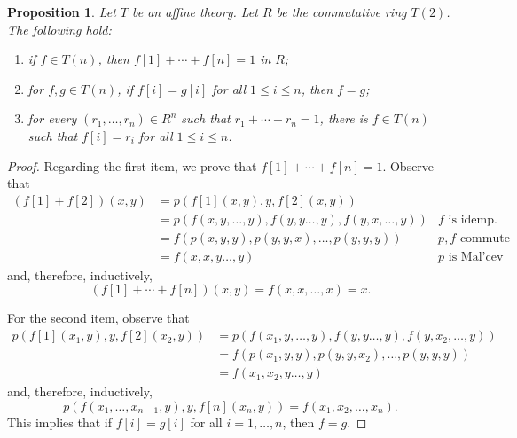 \documentclass{amsart}
\numberwithin{equation}{section}
\theoremstyle{plain}
\newtheorem{proposition}[theorem]{Proposition}
\theoremstyle{definition}
\begin{document}
\begin{proposition}
  \label{prop:coord}
  Let $T$ be an affine theory.
  Let $R$ be the commutative ring $T(2)$. 
  The following hold: 
  \begin{enumerate}
    \item if $f \in T(n)$, then $f[1]+\cdots+f[n]=1$ in $R$; 
    \item for $f,g \in T(n)$, if $f[i]=g[i]$ for all $1 \le i \le n$, then $f=g$; 
    \item for every $(r_1, \ldots, r_n) \in R^n$ such that $r_1+\cdots+r_n=1$, there is $f \in T(n)$ such that $f[i]=r_i$ for all $1 \le i \le n$. 
  \end{enumerate}
\end{proposition}
\begin{proof}
    Regarding the first item, we prove that $f[1] + \cdots + f[n] = 1$. 
    Observe that 
    \begin{align*}
      (f[1]+f[2])(x,y) & = p(f[1](x,y),y,f[2](x,y)) & \\
      & = p(f(x,y, \ldots, y) , f(y,y \ldots, y), f(y,x, \ldots, y)) & f \text{ is idemp.}\\
      & = f(p(x,y,y), p(y,y,x), \ldots, p(y,y,y)) & p,f \text{ commute} \\
      & = f(x,x,y \ldots, y) & p \text{ is Mal'cev} 
    \end{align*}
    and, therefore, inductively, 
    \begin{equation*}
      (f[1]+ \cdots + f[n])(x,y) = f(x,x, \ldots,x) =x \text{.}
    \end{equation*}

    For the second item, observe that 
    \begin{align*}
      p(f[1](x_1,y),y,f[2](x_2,y)) & = p(f(x_1,y, \ldots, y) , f(y,y \ldots, y), f(y,x_2, \ldots, y)) & \\
      & = f(p(x_1,y,y), p(y,y,x_2), \ldots, p(y,y,y)) &  \\
      & = f(x_1,x_2,y \ldots, y) &
    \end{align*}
    and, therefore, inductively, 
    \begin{equation*}
      p(f(x_1,\ldots,x_{n-1},y), y,f[n](x_n,y)) = f(x_1,x_2, \ldots,x_n)\text{.}
    \end{equation*}
    This implies that if $f[i]=g[i]$ for all $i=1, \ldots, n$, then $f = g$. 


\end{proof}
\end{document}
